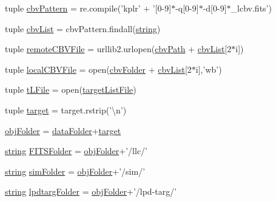 \begin{DoxyCompactItemize}
tuple \hyperlink{namespace_get_all_data_ab13b78016ebaf3b18c13c40b75b9ae3a}{cbv\-Pattern} = re.\-compile('kplr' + '\mbox{[}0-\/9\mbox{]}$\ast$-\/q\mbox{[}0-\/9\mbox{]}$\ast$-\/d\mbox{[}0-\/9\mbox{]}$\ast$\-\_\-lcbv.\-fits')
\item 
tuple \hyperlink{namespace_get_all_data_aef4e9610ed4d2405e028274abbfcdb43}{cbv\-List} = cbv\-Pattern.\-findall(\hyperlink{namespace_get_all_data_aa3f14258ba79c9dd527fc1805b92c818}{string})
\item 
tuple \hyperlink{namespace_get_all_data_a59840d46d0e238ee525782c0fbe13eeb}{remote\-C\-B\-V\-File} = urllib2.\-urlopen(\hyperlink{namespace_get_all_data_a0d44f716af41966e5d4c1e8ec5daca53}{cbv\-Path} + \hyperlink{namespace_get_all_data_aef4e9610ed4d2405e028274abbfcdb43}{cbv\-List}\mbox{[}2$\ast$i\mbox{]})
\item 
tuple \hyperlink{namespace_get_all_data_a48b2086a8ab4a4eb4383aaa810014866}{local\-C\-B\-V\-File} = open(\hyperlink{namespace_get_all_data_a92d210ac17aea3c86c2cae13d5dcf53a}{cbv\-Folder} + \hyperlink{namespace_get_all_data_aef4e9610ed4d2405e028274abbfcdb43}{cbv\-List}\mbox{[}2$\ast$i\mbox{]},'wb')
\item 
tuple \hyperlink{namespace_get_all_data_a7f0291de88ec75252bb7cfaa9a33997e}{t\-L\-File} = open(\hyperlink{namespace_get_all_data_a651d69300ed082b3426d3910b6c6a5f7}{target\-List\-File})
\item 
tuple \hyperlink{namespace_get_all_data_ae7c93a35b37e6a7e1f63026786f921e3}{target} = target.\-rstrip('\textbackslash{}n')
\item 
\hyperlink{namespace_get_all_data_ad1a3a2da71089668ef951488bd43ec72}{obj\-Folder} = \hyperlink{namespace_get_all_data_a8ff73cf768ddd833d026b762528dc864}{data\-Folder}+\hyperlink{namespace_get_all_data_ae7c93a35b37e6a7e1f63026786f921e3}{target}
\item 
\hyperlink{namespace_get_all_data_aa3f14258ba79c9dd527fc1805b92c818}{string} \hyperlink{namespace_get_all_data_a16ca85b9e5a52cb403c24f90f47e5380}{F\-I\-T\-S\-Folder} = \hyperlink{namespace_get_all_data_ad1a3a2da71089668ef951488bd43ec72}{obj\-Folder}+'/llc/'
\item 
\hyperlink{namespace_get_all_data_aa3f14258ba79c9dd527fc1805b92c818}{string} \hyperlink{namespace_get_all_data_ab8e095b44d1d2a618b9f44a372540200}{sim\-Folder} = \hyperlink{namespace_get_all_data_ad1a3a2da71089668ef951488bd43ec72}{obj\-Folder}+'/sim/'
\item 
\hyperlink{namespace_get_all_data_aa3f14258ba79c9dd527fc1805b92c818}{string} \hyperlink{namespace_get_all_data_a3f0df6e75a64830be35cfc3f992806c4}{lpdtarg\-Folder} = \hyperlink{namespace_get_all_data_ad1a3a2da71089668ef951488bd43ec72}{obj\-Folder}+'/lpd-\/targ/'

\end{DoxyCompactItemize}
